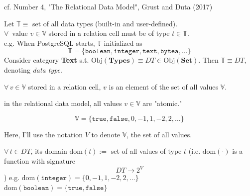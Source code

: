 cf. Number 4, "The Relational Data Model", Grust and Duta (2017) \cite{agat:GrDu2017}

\begin{definition}[Types]
Let $\mathbb{T} \equiv $ set of all data types (built-in and user-defined).  \\
$\forall \, $ value $v\in  \mathbb{V}$ stored in a relation cell must be of type $t\in \mathbb{T}$. \\
e.g. When PostgreSQL starts, $\mathbb{T}$ initialized as 
\begin{equation}
 \mathbb{T} = \lbrace \texttt{boolean}, \texttt{integer}, \texttt{text}, \texttt{bytea}, \dots \rbrace 
\end{equation}
Consider category \textbf{Text} s.t. $\text{Obj}(\mathbf{Types}) \equiv DT \in \text{Obj}(\textbf{Set})$. Then $\mathbb{T} \equiv DT$, denoting \emph{data type}.
\end{definition}

\begin{definition}[Values]
$\forall \, v \in \mathbb{V}$ stored in a relation cell, $v$ is an element of the set of all values $\mathbb{V}$. 

in the relational data model, all values $v\in \mathbb{V}$ are "atomic."

\[
\mathbb{V} = \lbrace \texttt{true}, \texttt{false}, 0, -1, 1, -2, 2 , \dots \rbrace
\]	

Here, I'll use the notation $V$ to denote $\mathbb{V}$, the set of all values.
\end{definition}

\begin{definition}[Domains]
	$\forall \, t \in DT$, its domain $\text{dom}(t) := $ set of all values of type $t$ (i.e. $\text{dom}(\cdot)$ is a function with signature 
	\[
	DT \to 2^V
	\])
	e.g. $\text{dom}(\texttt{integer}) = \lbrace 0 , -1, 1, -2, 2, \dots \rbrace $ \\
	$\text{dom}(\texttt{boolean}) = \lbrace \texttt{true}, \texttt{false} \rbrace$ 
\end{definition} 

